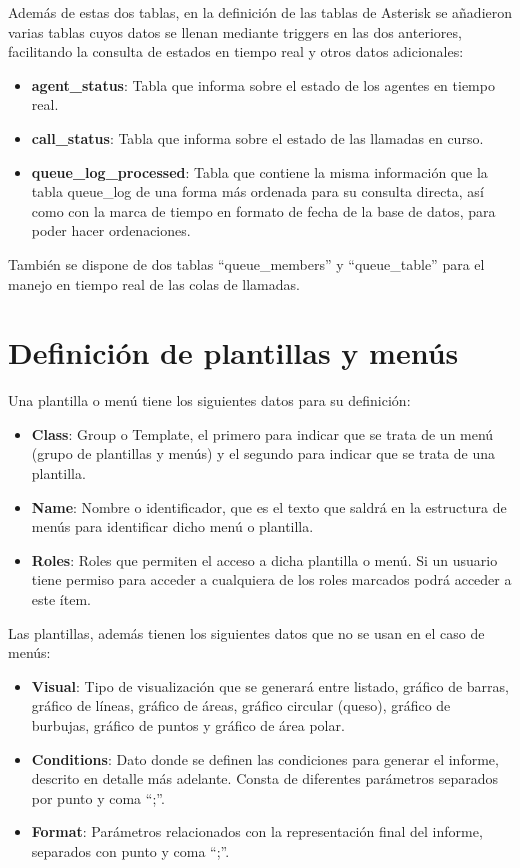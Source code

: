 \documentclass[spanish,12pt]{book}
\begin{document}
Además de estas dos tablas, en la definición de las tablas de Asterisk se añadieron varias tablas cuyos datos se llenan mediante triggers en las dos anteriores, facilitando la consulta de estados en tiempo real y otros datos adicionales:

\begin{itemize}
\item {\bf agent\_status}: Tabla que informa sobre el estado de los agentes en tiempo real.
\item {\bf call\_status}: Tabla que informa sobre el estado de las llamadas en curso.
\item {\bf queue\_log\_processed}: Tabla que contiene la misma información que la tabla queue\_log de una forma más ordenada para su consulta directa, así como con la marca de tiempo en formato de fecha de la base de datos, para poder hacer ordenaciones.
\end{itemize}

También se dispone de dos tablas ``queue\_members'' y ``queue\_table'' para el manejo en tiempo real de las colas de llamadas.

\section{Definición de plantillas y menús}
Una plantilla o menú tiene los siguientes datos para su definición:
\begin{itemize}
\item {\bf Class}: Group o Template, el primero para indicar que se trata de un menú (grupo de plantillas y menús) y el segundo para indicar que se trata de una plantilla.
\item {\bf Name}: Nombre o identificador, que es el texto que saldrá en la estructura de menús para identificar dicho menú o plantilla.
\item {\bf Roles}: Roles que permiten el acceso a dicha plantilla o menú. Si un usuario tiene permiso para acceder a cualquiera de los roles marcados podrá acceder a este ítem.
\end{itemize}

Las plantillas, además tienen los siguientes datos que no se usan en el caso de menús:
\begin{itemize}
\item {\bf Visual}: Tipo de visualización que se generará entre listado, gráfico de barras, gráfico de líneas, gráfico de áreas, gráfico circular (queso), gráfico de burbujas, gráfico de puntos y gráfico de área polar.
\item {\bf Conditions}: Dato donde se definen las condiciones para generar el informe, descrito en detalle más adelante. Consta de diferentes parámetros separados por punto y coma ``;''.
\item {\bf Format}: Parámetros relacionados con la representación final del informe, separados con punto y coma ``;''.
\end{itemize}
\end{document}
